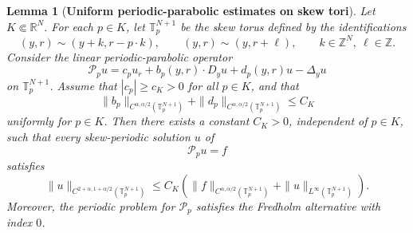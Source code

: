\documentclass[preprint]{elsarticle}
\newtheorem{lemma}{Lemma}[section]
\numberwithin{equation}{section}
\begin{document}
\begin{lemma}[\textbf{Uniform periodic-parabolic estimates on skew tori}]
Let $K\Subset\mathbb R^N$. For each $p\in K$, let $\mathbb T_p^{N+1}$ be the skew torus defined by the identifications
$$
(y,r)\sim(y+k,r-p\cdot k),
\qquad
(y,r)\sim(y,r+\ell),
\qquad
k\in\mathbb Z^N,\ \ell\in\mathbb Z.
$$
Consider the linear periodic-parabolic operator
\begin{equation*}
\mathcal P_p u
=
c_p u_r
+
b_p(y,r)\cdot D_yu
+
d_p(y,r)u
-
\Delta_yu
\end{equation*}
on $\mathbb T_p^{N+1}$. Assume that $|c_p|\ge c_K>0$
for all $p\in K$, and that
\begin{equation*}
\|b_p\|_{C^{\alpha,\alpha/2}(\mathbb T_p^{N+1})}
+
\|d_p\|_{C^{\alpha,\alpha/2}(\mathbb T_p^{N+1})}
\le C_K
\end{equation*}
uniformly for $p\in K$. Then there exists a constant $C_K>0$, independent of $p\in K$, such that every skew-periodic solution $u$ of
\begin{equation*}
\mathcal P_p u=f
\end{equation*}
satisfies
\begin{equation*}
\|u\|_{C^{2+\alpha,1+\alpha/2}(\mathbb T_p^{N+1})}
\le
C_K
\left(
\|f\|_{C^{\alpha,\alpha/2}(\mathbb T_p^{N+1})}
+
\|u\|_{L^\infty(\mathbb T_p^{N+1})}
\right).
\end{equation*}
Moreover, the periodic problem for $\mathcal P_p$ satisfies the Fredholm alternative with index $0$.\label{lem:uniform-skew-schauder}
\end{lemma}
\end{document}
